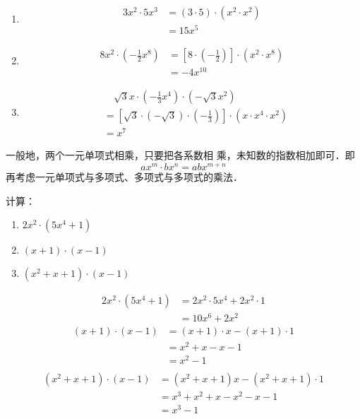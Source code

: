 \begin{solution}
\begin{enumerate}
    \item \begin{align*}
        3x^2\cdot 5x^3&=(3\cdot 5)\cdot (x^2\cdot x^2)\tag{交换、结合律}\\
        &=15x^5
    \end{align*}
    \item \begin{align*}
        8x^2\cdot \left(-\frac{1}{2}x^8\right)&=\left[8\cdot \left(-\frac{1}{2}\right)\right]\cdot (x^2\cdot x^8)\\
        &=-4x^{10}
    \end{align*}
    \item \begin{align*}
      &\quad   \sqrt{3}x\cdot \left(-\frac{1}{3}x^4\right)\cdot \left(-\sqrt{3}x^2\right)\\      
      &= \left[\sqrt{3}\cdot \left(-\sqrt{3}\right)\cdot \left(-\frac{1}{3}\right)\right]\cdot (x\cdot x^4\cdot x^2)\\
      &=x^7 
    \end{align*}   
\end{enumerate} 
\end{solution}

一般地，两个一元单项式相乘，只要把各系数相
乘，未知数的指数相加即可．即
\[ ax^m\cdot bx^n =abx^{m+n}\]
再考虑一元单项式与多项式、多项式与多项式的乘法．

\begin{example}
    计算：
    \begin{enumerate}
        \item $2x^2\cdot (5x^4+1)$
        \item $(x+1)\cdot (x-1)$
        \item $(x^2+x+1)\cdot (x-1)$
    \end{enumerate}   
\end{example}

\begin{solution}
\begin{align*}
    2x^2\cdot (5x^4+1)&=2x^2\cdot 5x^4+ 2x^2\cdot 1\tag{分配律}\\
    &=10x^6+2x^2
\end{align*}
\begin{align*}
    (x+1)\cdot (x-1)&=(x+1)\cdot x-  (x+1)\cdot 1 \tag{分配律}\\
    &=x^2+x-x-1  \tag{分配律}\\
    &=x^2-1 \tag{合并同类项}\\
\end{align*}   
\begin{align*}
    (x^2+x+1)\cdot (x-1)&=(x^2+x+1)x-(x^2+x+1)\cdot 1\\
    &=x^3+x^2+x-x^2-x-1\\
    &=x^3-1
\end{align*}
\end{solution}

